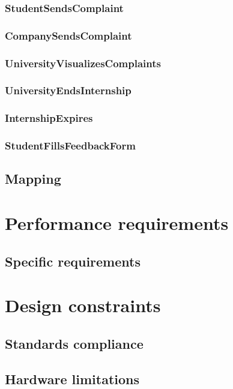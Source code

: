 \subsubsection{StudentSendsComplaint}

\subsubsection{CompanySendsComplaint}

\subsubsection{UniversityVisualizesComplaints}

\subsubsection{UniversityEndsInternship}

\subsubsection{InternshipExpires}

\subsubsection{StudentFillsFeedbackForm}

\subsection{Mapping}

\section{Performance requirements}

\subsection{Specific requirements}

\section{Design constraints}
\subsection{Standards compliance}
\subsection{Hardware limitations}

